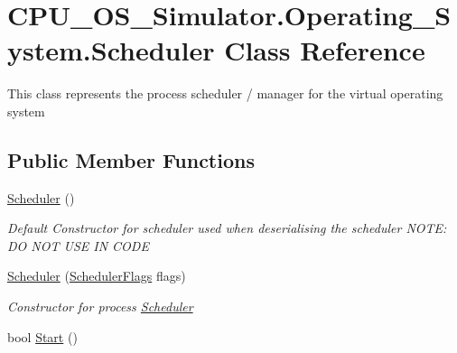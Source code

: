 \hypertarget{class_c_p_u___o_s___simulator_1_1_operating___system_1_1_scheduler}{}\section{C\+P\+U\+\_\+\+O\+S\+\_\+\+Simulator.\+Operating\+\_\+\+System.\+Scheduler Class Reference}
\label{class_c_p_u___o_s___simulator_1_1_operating___system_1_1_scheduler}


This class represents the process scheduler / manager for the virtual operating system  


\subsection*{Public Member Functions}
\begin{DoxyCompactItemize}
\item 
\hyperlink{class_c_p_u___o_s___simulator_1_1_operating___system_1_1_scheduler_a5911adf7a88d4bc66f0de915bb925461}{Scheduler} ()
\begin{DoxyCompactList}\small\item\em Default Constructor for scheduler used when deserialising the scheduler N\+O\+T\+E\+: D\+O N\+O\+T U\+S\+E I\+N C\+O\+D\+E \end{DoxyCompactList}\item 
\hyperlink{class_c_p_u___o_s___simulator_1_1_operating___system_1_1_scheduler_a686c31e6925c34fa366b0dfee0881950}{Scheduler} (\hyperlink{struct_c_p_u___o_s___simulator_1_1_operating___system_1_1_scheduler_flags}{Scheduler\+Flags} flags)
\begin{DoxyCompactList}\small\item\em Constructor for process \hyperlink{class_c_p_u___o_s___simulator_1_1_operating___system_1_1_scheduler}{Scheduler} \end{DoxyCompactList}\item 
bool \hyperlink{class_c_p_u___o_s___simulator_1_1_operating___system_1_1_scheduler_a0c5d3add7cf99eeb8c58c0a009ba6741}{Start} ()
\end{DoxyCompactItemize}
